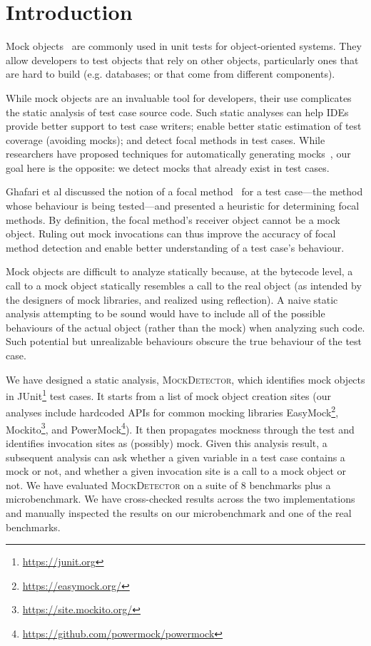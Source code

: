 \section{Introduction}
\label{sec:introduction}

Mock objects~\cite{beck02:_test_driven_devel} are commonly used in
unit tests for object-oriented systems.  They allow developers to test objects that 
rely on other objects, particularly ones that are hard 
to build (e.g. databases; or that come from different components).

While mock objects are an invaluable tool for developers, their use
complicates the static analysis of test case source code. 
Such static analyses can help IDEs provide better
support to test case writers; enable better static estimation of test coverage
(avoiding mocks); and detect focal methods in test cases. While researchers have
proposed techniques for automatically generating mocks~\cite{alshahwan10:_autom,fazzini20:_framew_autom_test_mockin_mobil_apps}, our goal here is the opposite:
we detect mocks that already exist in test cases.

Ghafari et al discussed the notion of a focal method~\cite{ghafari15:_autom} for a test case---the method
whose behaviour is being tested---and presented a heuristic for determining focal methods.
By definition, the focal method's receiver object cannot be a mock object.
Ruling out mock invocations can thus improve the accuracy of focal method detection and
enable better understanding of a test case's behaviour.

Mock objects are difficult to analyze statically because, at the bytecode level,
a call to a mock object statically resembles a call to the real object (as
intended by the designers of mock libraries, and realized using reflection).
A naive static analysis attempting to be sound would have to include all of 
the possible behaviours of the actual object (rather than the mock) when analyzing such code. 
Such potential but unrealizable behaviours obscure the true behaviour 
of the test case.

We have designed a static analysis, \textsc{MockDetector}, which identifies
mock objects in JUnit\footnote{\url{https://junit.org}} test cases. It starts from a list of mock object creation sites
(our analyses include hardcoded APIs for common mocking libraries EasyMock\footnote{\url{https://easymock.org/}}, Mockito\footnote{\url{https://site.mockito.org/}}, and PowerMock\footnote{\url{https://github.com/powermock/powermock}}). 
It then propagates mockness
through the test and identifies invocation sites as (possibly) mock.
Given this analysis result, a subsequent analysis
can ask whether a given variable in a test case contains a mock or not, and
whether a given invocation site is a call to a mock object or not. We have
evaluated \textsc{MockDetector} on a suite of 8 benchmarks plus a microbenchmark. 
We have cross-checked results across the two implementations and manually inspected
the results on our microbenchmark and one of the real benchmarks.


